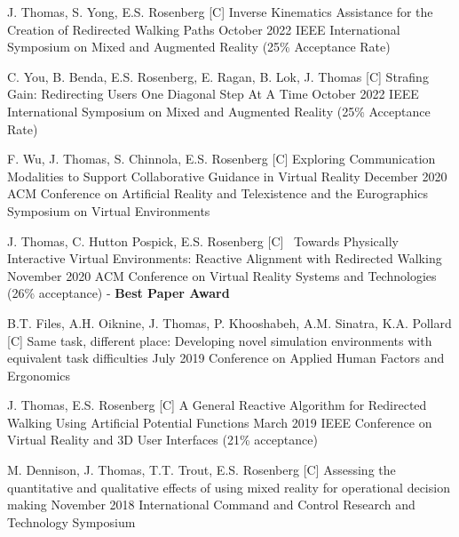 \setcounter{npubs}{1}
\begin{cvpubs}
  \cvpub
    {J. Thomas, S. Yong, E.S. Rosenberg} %
    {[C\thenpubs] Inverse Kinematics Assistance for the Creation of Redirected Walking Paths} %
    {October 2022} %
    {IEEE International Symposium on Mixed and Augmented Reality (25\% Acceptance Rate)} %
      
  \cvpub
    {C. You, B. Benda, E.S. Rosenberg, E. Ragan, B. Lok, J. Thomas} %
	{[C\thenpubs] Strafing Gain: Redirecting Users One Diagonal Step At A Time }%
    {October 2022} %
    {IEEE International Symposium on Mixed and Augmented Reality (25\% Acceptance Rate)} %
    
  \cvpub
    {F. Wu, J. Thomas, S. Chinnola, E.S. Rosenberg} %
    {[C\thenpubs] Exploring Communication Modalities to Support Collaborative Guidance in Virtual Reality} %
    {December 2020} %
    {ACM Conference on Artificial Reality and Telexistence and the Eurographics Symposium on Virtual Environments}%
    
  \cvpub
    {J. Thomas, C. Hutton Pospick, E.S. Rosenberg} %
    {[C\thenpubs]\ \textcolor{awesome}{\faTrophy} Towards Physically Interactive Virtual Environments: Reactive Alignment with Redirected Walking} %
    {November 2020} %
    {ACM Conference on Virtual Reality Systems and Technologies (26\% acceptance) - \textbf{Best Paper Award}}
    
  \cvpub
    {B.T. Files, A.H. Oiknine, J. Thomas, P. Khooshabeh, A.M. Sinatra, K.A. Pollard} %
    {[C\thenpubs] Same task, different place: Developing novel simulation environments with equivalent task difficulties} %
    {July 2019} %
    {Conference on Applied Human Factors and Ergonomics} %
    
  \cvpub
    {J. Thomas, E.S. Rosenberg} %
    {[C\thenpubs] A General Reactive Algorithm for Redirected Walking Using Artificial Potential Functions} %
    {March 2019} %
    {IEEE Conference on Virtual Reality and 3D User Interfaces (21\% acceptance)}
    
  \cvpub
    {M. Dennison, J. Thomas, T.T. Trout, E.S. Rosenberg} %
    {[C\thenpubs] Assessing the quantitative and qualitative effects of using mixed reality for operational decision making} %
    {November 2018} %
    {International Command and Control Research and Technology Symposium} %
    

\end{cvpubs}
